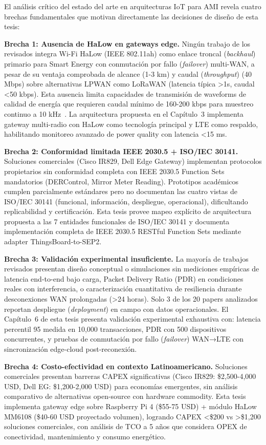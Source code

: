 El análisis crítico del estado del arte en arquitecturas IoT para AMI revela cuatro brechas fundamentales que motivan directamente las decisiones de diseño de esta tesis:

\textbf{Brecha 1: Ausencia de HaLow en gateways edge.} Ningún trabajo de los revisados integra Wi-Fi HaLow (IEEE 802.11ah) como enlace troncal (\textit{backhaul}) primario para Smart Energy con conmutación por fallo (\textit{failover}) multi-WAN, a pesar de su ventaja comprobada de alcance (1-3 km) y caudal (\textit{throughput}) (40 Mbps) sobre alternativas LPWAN como LoRaWAN (latencia típica >1s, caudal <50 kbps). Esta ausencia limita capacidades de transmisión de waveforms de calidad de energía que requieren caudal mínimo de 160-200 kbps para muestreo continuo a 10 kHz~\cite{chaudhariLPWANTechnologiesEmerging2020}. La arquitectura propuesta en el Capítulo~3 implementa gateway multi-radio con HaLow como tecnología principal y LTE como respaldo, habilitando monitoreo avanzado de power quality con latencia <15 ms.

\textbf{Brecha 2: Conformidad limitada IEEE 2030.5 + ISO/IEC 30141.} Soluciones comerciales (Cisco IR829, Dell Edge Gateway) implementan protocolos propietarios sin conformidad completa con IEEE 2030.5 Function Sets mandatorios (DERControl, Mirror Meter Reading). Prototipos académicos cumplen parcialmente estándares pero no documentan las cuatro vistas de ISO/IEC 30141 (funcional, información, despliegue, operacional), dificultando replicabilidad y certificación. Esta tesis provee mapeo explícito de arquitectura propuesta a las 7 entidades funcionales de ISO/IEC 30141 y documenta implementación completa de IEEE 2030.5 RESTful Function Sets mediante adapter ThingsBoard-to-SEP2.

\textbf{Brecha 3: Validación experimental insuficiente.} La mayoría de trabajos revisados presentan diseño conceptual o simulaciones sin mediciones empíricas de latencia end-to-end bajo carga, Packet Delivery Ratio (PDR) en condiciones reales con interferencia, o caracterización cuantitativa de resiliencia durante desconexiones WAN prolongadas (>24 horas). Solo 3 de los 20 papers analizados reportan despliegue (\textit{deployment}) en campo con datos operacionales. El Capítulo~6 de esta tesis presenta validación experimental exhaustiva con: latencia percentil 95 medida en 10,000 transacciones, PDR con 500 dispositivos concurrentes, y pruebas de conmutación por fallo (\textit{failover}) WAN→LTE con sincronización edge-cloud post-reconexión.

\textbf{Brecha 4: Costo-efectividad en contexto Latinoamericano.} Soluciones comerciales presentan barreras CAPEX significativas (Cisco IR829: \$2,500-4,000 USD, Dell EG: \$1,200-2,000 USD) para economías emergentes, sin análisis comparativo de alternativas open-source con hardware commodity. Esta tesis implementa gateway edge sobre Raspberry Pi 4 (\$55-75 USD) + módulo HaLow MM6108 (\$40-60 USD proyectado volumen), logrando CAPEX <\$200 vs >\$1,200 soluciones comerciales, con análisis de TCO a 5 años que considera OPEX de conectividad, mantenimiento y consumo energético.

